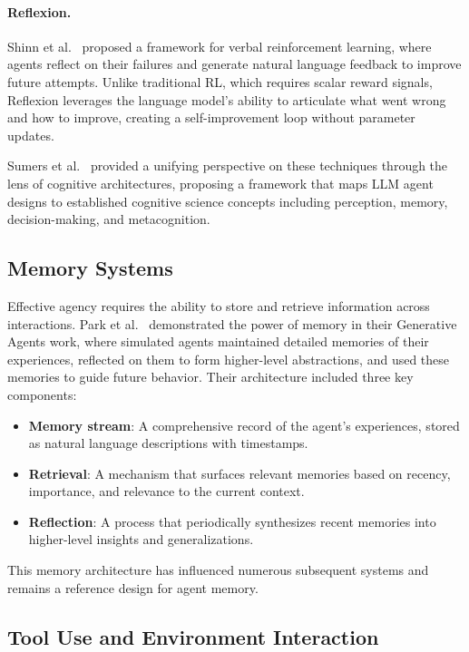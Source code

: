 \documentclass[11pt,a4paper]{article}
\begin{document}
\paragraph{Reflexion.} Shinn et al.~\citep{shinn2024reflexion} proposed a framework for verbal reinforcement learning, where agents reflect on their failures and generate natural language feedback to improve future attempts. Unlike traditional RL, which requires scalar reward signals, Reflexion leverages the language model's ability to articulate what went wrong and how to improve, creating a self-improvement loop without parameter updates.

Sumers et al.~\citep{sumers2024cognitive} provided a unifying perspective on these techniques through the lens of cognitive architectures, proposing a framework that maps LLM agent designs to established cognitive science concepts including perception, memory, decision-making, and metacognition.

\subsection{Memory Systems}

Effective agency requires the ability to store and retrieve information across interactions. Park et al.~\citep{park2023generative} demonstrated the power of memory in their Generative Agents work, where simulated agents maintained detailed memories of their experiences, reflected on them to form higher-level abstractions, and used these memories to guide future behavior. Their architecture included three key components:

\begin{itemize}
    \item \textbf{Memory stream}: A comprehensive record of the agent's experiences, stored as natural language descriptions with timestamps.
    \item \textbf{Retrieval}: A mechanism that surfaces relevant memories based on recency, importance, and relevance to the current context.
    \item \textbf{Reflection}: A process that periodically synthesizes recent memories into higher-level insights and generalizations.
\end{itemize}

This memory architecture has influenced numerous subsequent systems and remains a reference design for agent memory.

\subsection{Tool Use and Environment Interaction}
\end{document}
